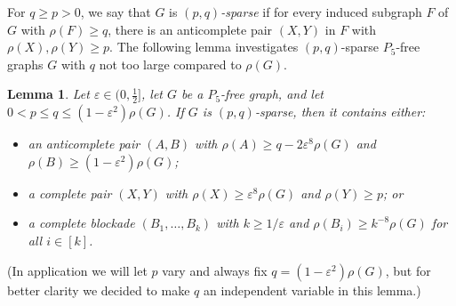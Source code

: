 \documentclass[11pt,reqno]{amsart}
\newtheorem{lemma}[theorem]{Lemma}
\newcommand{\eps}{\varepsilon}
\begin{document}
	For $q\ge p>0$, we say that $G$ is {\em $(p,q)$-sparse} if for every induced subgraph $F$ of $G$ with $\rho(F)\ge q$,
	there is an anticomplete pair $(X,Y)$ in $F$ with $\rho(X),\rho(Y)\ge p$.
	The following lemma investigates $(p,q)$-sparse $P_5$-free graphs $G$ with $q$ not too large compared to $\rho(G)$.
	\begin{lemma}
		\label{lem:anti}
		Let $\eps\in(0,\frac12]$, let $G$ be a $P_5$-free graph, and let $0<p\le q\le(1-\eps^2)\rho(G)$. 
		If $G$ is $(p,q)$-sparse, then it contains either:
		\begin{itemize}
			\item an anticomplete pair $(A,B)$ with $\rho(A)\ge q-2\eps^8\rho(G)$ and $\rho(B)\ge(1-\eps^2)\rho(G)$;
			
			\item a complete pair $(X,Y)$ with $\rho(X)\ge \eps^8\rho(G)$ and $\rho(Y)\ge p$; or
			
			\item a complete blockade $(B_1,\ldots,B_k)$ with $k\ge1/\eps$ and $\rho(B_i)\ge k^{-8}\rho(G)$ for all $i\in[k]$.
		\end{itemize}
	\end{lemma}
	(In application we will let $p$ vary and always fix $q=(1-\eps^2)\rho(G)$, but for better clarity we decided to make $q$ an independent variable in this lemma.)
\end{document}
